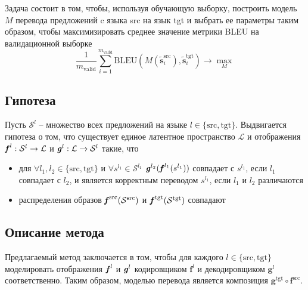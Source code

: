\documentclass[12pt,twoside]{article}
\begin{document}
Задача состоит в том, чтобы, используя обучающую выборку, построить модель $M$ перевода предложений c языка src на язык tgt и выбрать ее параметры таким образом, чтобы максимизировать среднее значение метрики BLEU на валидационной выборке 
$$
\frac{1}{m_{\text{valid}}} \sum_{i=1}^{m_{\text{valid}}} \text{BLEU}(M(\mathbf{\tilde{s}}_i^{\text{src}}), \mathbf{\tilde{s}}_i^{\text{tgt}}) \to \max_{M}
$$ 

\subsection{Гипотеза}
Пусть $\mathcal{S}^{l}$ -- множество всех предложений на языке $l \in \{\text{src}, \text{tgt}\}$. Выдвигается гипотеза о том, что существует единое латентное пространство $\mathcal{L}$ и отображения $\textbf{\textit{f}}^{l}: \mathcal{S}^{l} \to \mathcal{L}$ и $\textbf{\textit{g}}^{l}: \mathcal{L} \to \mathcal{S}^{l}$ такие, что 
\begin{itemize}
	\item для $\forall l_1, l_2 \in \{\text{src}, \text{tgt}\}$ и $\forall s^{l_1} \in \mathcal{S}^{l_1}$ $\textbf{\textit{g}}^{l_2}(\textbf{\textit{f}}^{l_1}(s^{l_1}))$ совпадает с $s^{l_1}$, если $l_1$ совпадает с $l_2$, и является корректным переводом $s^{l_1}$, если $l_1$ и $l_2$ различаются
	
	
	\item распределения образов $\textbf{\textit{f}}^{\text{src}}(\mathcal{S}^{\text{src}})$ и $\textbf{\textit{f}}^{\text{tgt}}(\mathcal{S}^{\text{tgt}})$ совпадают
\end{itemize}

\subsection{Описание метода}
Предлагаемый метод заключается в том, чтобы для каждого $l \in \{\text{src}, \text{tgt}\}$  моделировать отображения $\textbf{\textit{f}}^{l}$ и $\textbf{\textit{g}}^{l}$ кодировщиком $\textbf{f}^{l}$ и декодировщиком $\textbf{g}^{l}$ соответственно. Таким образом, моделью перевода является композиция $\textbf{g}^{\text{tgt}} \circ \textbf{f}^{\text{src}}$. 
\end{document}
